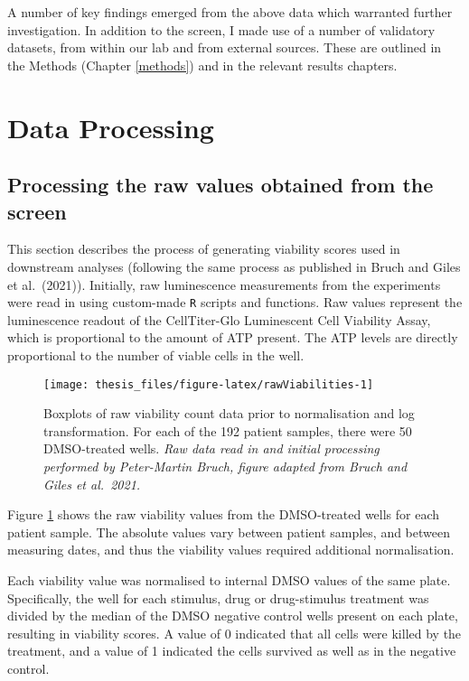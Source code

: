 \documentclass[11pt, a4paper, twosided]{book}
\begin{document}
A number of key findings emerged from the above data which warranted further investigation. In addition to the screen, I made use of a number of validatory datasets, from within our lab and from external sources. These are outlined in the Methods (Chapter \ref{methods}) and in the relevant results chapters.

\hypertarget{data-processing}{%
\section{Data Processing}\label{data-processing}}

\hypertarget{processing-the-raw-values-obtained-from-the-screen}{%
\subsection{Processing the raw values obtained from the screen}\label{processing-the-raw-values-obtained-from-the-screen}}

This section describes the process of generating viability scores used in downstream analyses (following the same process as published in Bruch and Giles et al.~(2021)). Initially, raw luminescence measurements from the experiments were read in using custom-made \texttt{R} scripts and functions. Raw values represent the luminescence readout of the CellTiter-Glo Luminescent Cell Viability Assay, which is proportional to the amount of ATP present. The ATP levels are directly proportional to the number of viable cells in the well.


\begin{figure}

{\centering \texttt{[image: thesis\_files/figure-latex/rawViabilities-1]} 

}

\caption{Boxplots of raw viability count data prior to normalisation and log transformation. For each of the 192 patient samples, there were 50 DMSO-treated wells. \emph{Raw data read in and initial processing performed by Peter-Martin Bruch, figure adapted from Bruch and Giles et al.~2021.}}\label{fig:rawViabilities}
\end{figure}
Figure \ref{fig:rawViabilities} shows the raw viability values from the DMSO-treated wells for each patient sample. The absolute values vary between patient samples, and between measuring dates, and thus the viability values required additional normalisation.

Each viability value was normalised to internal DMSO values of the same plate. Specifically, the well for each stimulus, drug or drug-stimulus treatment was divided by the median of the DMSO negative control wells present on each plate, resulting in viability scores. A value of 0 indicated that all cells were killed by the treatment, and a value of 1 indicated the cells survived as well as in the negative control.
\end{document}
